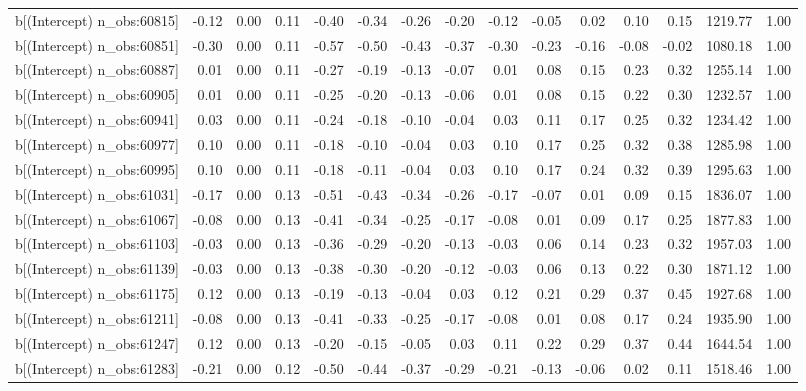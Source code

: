 \begin{table}[ht]
\begin{tabular}{rrrrrrrrrrrrrrr}
  b[(Intercept) n\_obs:60815] & -0.12 & 0.00 & 0.11 & -0.40 & -0.34 & -0.26 & -0.20 & -0.12 & -0.05 & 0.02 & 0.10 & 0.15 & 1219.77 & 1.00 \\ 
  b[(Intercept) n\_obs:60851] & -0.30 & 0.00 & 0.11 & -0.57 & -0.50 & -0.43 & -0.37 & -0.30 & -0.23 & -0.16 & -0.08 & -0.02 & 1080.18 & 1.00 \\ 
  b[(Intercept) n\_obs:60887] & 0.01 & 0.00 & 0.11 & -0.27 & -0.19 & -0.13 & -0.07 & 0.01 & 0.08 & 0.15 & 0.23 & 0.32 & 1255.14 & 1.00 \\ 
  b[(Intercept) n\_obs:60905] & 0.01 & 0.00 & 0.11 & -0.25 & -0.20 & -0.13 & -0.06 & 0.01 & 0.08 & 0.15 & 0.22 & 0.30 & 1232.57 & 1.00 \\ 
  b[(Intercept) n\_obs:60941] & 0.03 & 0.00 & 0.11 & -0.24 & -0.18 & -0.10 & -0.04 & 0.03 & 0.11 & 0.17 & 0.25 & 0.32 & 1234.42 & 1.00 \\ 
  b[(Intercept) n\_obs:60977] & 0.10 & 0.00 & 0.11 & -0.18 & -0.10 & -0.04 & 0.03 & 0.10 & 0.17 & 0.25 & 0.32 & 0.38 & 1285.98 & 1.00 \\ 
  b[(Intercept) n\_obs:60995] & 0.10 & 0.00 & 0.11 & -0.18 & -0.11 & -0.04 & 0.03 & 0.10 & 0.17 & 0.24 & 0.32 & 0.39 & 1295.63 & 1.00 \\ 
  b[(Intercept) n\_obs:61031] & -0.17 & 0.00 & 0.13 & -0.51 & -0.43 & -0.34 & -0.26 & -0.17 & -0.07 & 0.01 & 0.09 & 0.15 & 1836.07 & 1.00 \\ 
  b[(Intercept) n\_obs:61067] & -0.08 & 0.00 & 0.13 & -0.41 & -0.34 & -0.25 & -0.17 & -0.08 & 0.01 & 0.09 & 0.17 & 0.25 & 1877.83 & 1.00 \\ 
  b[(Intercept) n\_obs:61103] & -0.03 & 0.00 & 0.13 & -0.36 & -0.29 & -0.20 & -0.13 & -0.03 & 0.06 & 0.14 & 0.23 & 0.32 & 1957.03 & 1.00 \\ 
  b[(Intercept) n\_obs:61139] & -0.03 & 0.00 & 0.13 & -0.38 & -0.30 & -0.20 & -0.12 & -0.03 & 0.06 & 0.13 & 0.22 & 0.30 & 1871.12 & 1.00 \\ 
  b[(Intercept) n\_obs:61175] & 0.12 & 0.00 & 0.13 & -0.19 & -0.13 & -0.04 & 0.03 & 0.12 & 0.21 & 0.29 & 0.37 & 0.45 & 1927.68 & 1.00 \\ 
  b[(Intercept) n\_obs:61211] & -0.08 & 0.00 & 0.13 & -0.41 & -0.33 & -0.25 & -0.17 & -0.08 & 0.01 & 0.08 & 0.17 & 0.24 & 1935.90 & 1.00 \\ 
  b[(Intercept) n\_obs:61247] & 0.12 & 0.00 & 0.13 & -0.20 & -0.15 & -0.05 & 0.03 & 0.11 & 0.22 & 0.29 & 0.37 & 0.44 & 1644.54 & 1.00 \\ 
  b[(Intercept) n\_obs:61283] & -0.21 & 0.00 & 0.12 & -0.50 & -0.44 & -0.37 & -0.29 & -0.21 & -0.13 & -0.06 & 0.02 & 0.11 & 1518.46 & 1.00 \\ 

\end{tabular}
\end{table}
